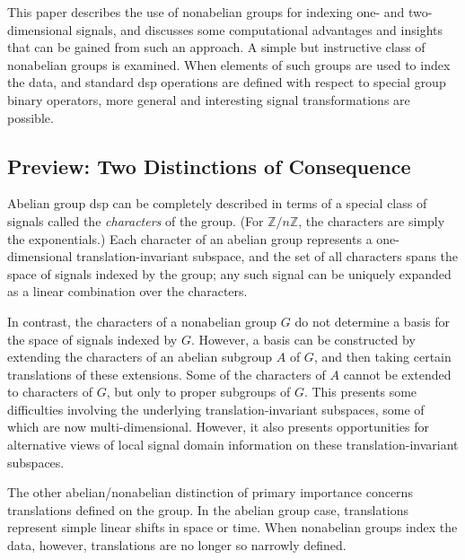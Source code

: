 \documentclass[reqno,onecolumn,oneside]{paper}
\theoremstyle{plain}
\theoremstyle{definition}
\theoremstyle{remark}
\numberwithin{theorem}{section}
\numberwithin{claim}{section}
\numberwithin{equation}{section}
\numberwithin{conjecture}{section}
\newcommand{\<}{\ensuremath{\langle}}
\renewcommand{\>}{\ensuremath{\rangle}}
\newcommand{\Z}{\ensuremath{\mathbb{Z}}}
\begin{document}
This paper describes the use of nonabelian groups
for indexing one- and two-dimensional signals, and discusses 
some computational advantages and insights that can be gained from 
such an approach. 
A simple but instructive class of 
nonabelian groups 
is examined.  When elements of such
groups are used to index the data, and standard \ac{dsp}
operations are defined with respect to special group
binary operators, more general and interesting
signal transformations are possible.
\subsection{Preview: Two Distinctions of Consequence}
Abelian group \ac{dsp} can be completely described in terms of a
special class of signals called the \emph{characters} of the
group. (For $\Z/n\Z$, the characters are simply the exponentials.)
Each character of an abelian group represents a one-dimensional
translation-invariant subspace, and the set of all characters
spans the space of signals indexed by the group; any such
signal can be uniquely expanded as a linear combination over
the characters.


In contrast, the characters of a nonabelian group $G$ %
do not determine a basis for the space of signals indexed by
$G$.  However, a basis can be constructed by extending the
characters of an abelian subgroup $A$ of $G$, and then taking
certain translations of these extensions.  Some of the
characters of $A$ cannot be extended to characters of $G$,
but only to proper subgroups of $G$.  This presents some
difficulties involving the underlying translation-invariant
subspaces, some of which are now multi-dimensional.
However, it also presents opportunities for alternative
views of local signal domain information on these
translation-invariant subspaces. 

The other abelian/nonabelian distinction of primary importance 
concerns translations defined on the group.  In the abelian group
case, translations represent simple linear shifts in space or time.
When nonabelian groups index the data, however, translations are no
longer so narrowly defined. 


%
%
%
\end{document}
